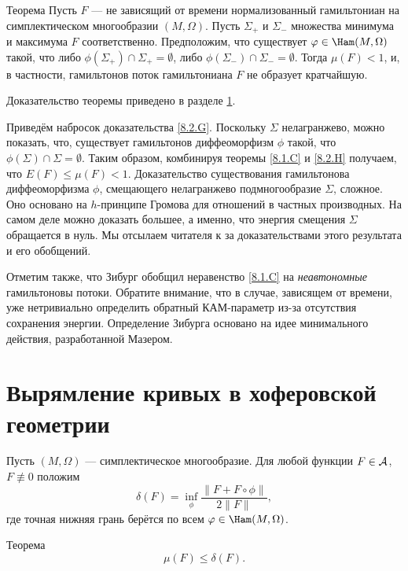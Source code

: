 \begin{thm}{Теорема}\label{8.2.H}
Пусть $F$ — не зависящий от времени нормализованный гамильтониан на
симплектическом многообразии $ (M, \Omega)$. 
Пусть $\Sigma_+$  и $\Sigma_-$ 
  множества минимума и максимума $F$ соответственно.
Предположим, что существует $\phi \in \Ham (M, \Omega)$ такой, что
либо $\phi (\Sigma_+) \cap \Sigma_+ = \emptyset$, либо $\phi
(\Sigma_-) \cap \Sigma_- = \emptyset$. 
Тогда $\mu (F) <1$, и, в частности, гамильтонов поток
гамильтониана $F$ не образует
кратчайшую.  
\end{thm}

Доказательство теоремы приведено в разделе \ref{sec:8.3}.

Приведём набросок доказательства \ref{8.2.G}.
Поскольку $\Sigma$ нелагранжево, можно показать, что, существует гамильтонов диффеоморфизм $\phi$ такой, что
$\phi(\Sigma) \cap \Sigma = \emptyset$. 
Таким образом, комбинируя теоремы \ref{8.1.C} и \ref{8.2.H} получаем,
что $E (F) \le \mu (F) <1$. 
Доказательство существования гамильтонова диффеоморфизма $\phi$,
смещающего нелагранжево подмногообразие $\Sigma$, сложное. 
Оно основано на $h$-принципе Громова для отношений в частных производных.
На самом деле можно доказать большее, а именно, что энергия смещения
$\Sigma$ обращается в нуль. 
Мы отсылаем читателя к \cite{P2,LS} за доказательствами этого
результата и его обобщений. 

Отметим также, что Зибург \cite{Si2} обобщил неравенство \ref{8.1.C}
на {}\emph{неавтономные} гамильтоновы потоки. 
Обратите внимание, что в случае, зависящем от времени, уже
нетривиально определить обратный КАМ-параметр из-за отсутствия
сохранения энергии. 
Определение Зибурга основано на идее минимального действия,
разработанной Мазером. 

\section{Вырямление кривых в хоферовской геометрии}\label{sec:8.3}

Пусть $(M, \Omega)$ — симплектическое многообразие.
Для любой функции $F \in \mathcal{A}$, $F \not\equiv 0$ положим 
\[\delta(F)=\inf_\phi \frac{\|F+ F \circ \phi\|}{2\|F\|},\]
где точная нижняя грань берётся по всем $\phi \in \Ham (M, \Omega)$.

\begin{thm}[(\cite{BP2})]{Теорема}\label{8.3.A}
\[\mu (F) \le \delta (F).\]
\end{thm}

